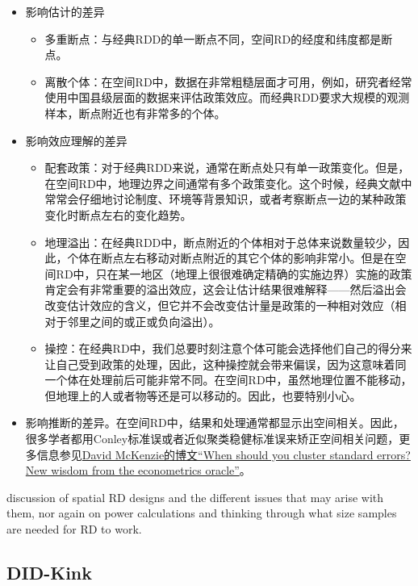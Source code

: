 \documentclass[cn,12pt,math=newtx,citestyle=gb7714-2015,bibstyle=gb7714-2015]{elegantbook}
\begin{document}
	\begin{itemize}
		\item 影响估计的差异
		\begin{itemize}
			\item 多重断点：与经典RDD的单一断点不同，空间RD的经度和纬度都是断点。
			\item 离散个体：在空间RD中，数据在非常粗糙层面才可用，例如，研究者经常使用中国县级层面的数据来评估政策效应。而经典RDD要求大规模的观测样本，断点附近也有非常多的个体。
		\end{itemize}
	    \item 影响效应理解的差异
	    \begin{itemize}
	    	\item 配套政策：对于经典RDD来说，通常在断点处只有单一政策变化。但是，在空间RD中，地理边界之间通常有多个政策变化。这个时候，经典文献中常常会仔细地讨论制度、环境等背景知识，或者考察断点一边的某种政策变化时断点左右的变化趋势。
	    	\item 地理溢出：在经典RDD中，断点附近的个体相对于总体来说数量较少，因此，个体在断点左右移动对断点附近的其它个体的影响非常小。但是在空间RD中，只在某一地区（地理上很很难确定精确的实施边界）实施的政策肯定会有非常重要的溢出效应，这会让估计结果很难解释——然后溢出会改变估计效应的含义，但它并不会改变估计量是政策的一种相对效应（相对于邻里之间的或正或负向溢出）。
	    	\item 操控：在经典RD中，我们总要时刻注意个体可能会选择他们自己的得分来让自己受到政策的处理，因此，这种操控就会带来偏误，因为这意味着同一个体在处理前后可能非常不同。在空间RD中，虽然地理位置不能移动，但地理上的人或者物等还是可以移动的。因此，也要特别小心。
	    \end{itemize}
        \item 影响推断的差异。在空间RD中，结果和处理通常都显示出空间相关。因此，很多学者都用Conley标准误或者近似聚类稳健标准误来矫正空间相关问题，更多信息参见\href{https://blogs.worldbank.org/impactevaluations/when-should-you-cluster-standard-errors-new-wisdom-econometrics-oracle}{David McKenzie的博文“When should you cluster standard errors? New wisdom from the econometrics oracle”}。
	\end{itemize}
	
	
	
	discussion of spatial RD designs and the different issues that may arise with them, nor again on power calculations and thinking through what size samples are needed for RD to work.
	
	
	
	\subsection{DID-Kink}
	
\end{document}
